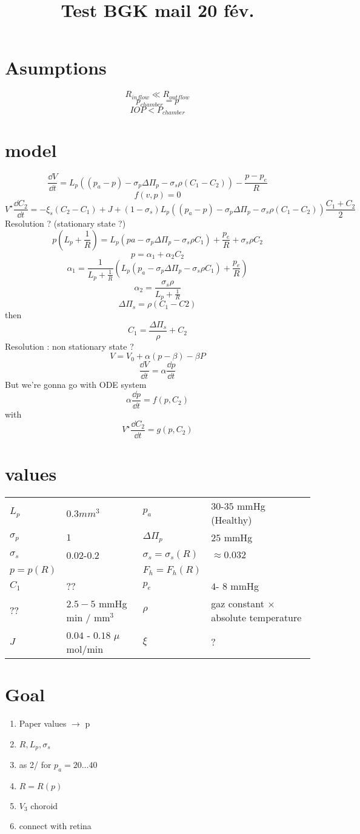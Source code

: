 \documentclass[11pt]{article}
\author{}
\title{Test BGK mail 20 fév.}
\date{}
\begin{document}
\section{Asumptions}
\[
R_{inflow} \ll R_{outflow}
\]
\[
p_{chamber} = p
\]
\[
IOP < P_{chamber}
\]

\section{model}
\[
\frac{\dd V}{\dd t} = L_{p} \left( (p_{a} -p) - \sigma_{p} \Delta \Pi_{p} - \sigma_{s} \rho (C_{1}- C_{2}) \right) - \frac{p - p_{e} }{R}
\]
\[
f(v,p) = 0
\]
\[
V^\star \frac{\dd C_2}{\dd t} = - \xi_s (C_2-C_1) + J + \left(1- \sigma_s\right)L_p\left((p_a-p) - \sigma_p \Delta \Pi_p - \sigma_s \rho (C_1-C_2) \right) \frac{C_1 + C_2}{2}
\]
Resolution ? (stationary state ?)
\[
p\left( L_p + \frac{1}{R} \right) = L_p \left(pa - \sigma_p \Delta \Pi_p - \sigma_s \rho C_1\right) + \frac{p_e}{R} + \sigma_s \rho C_2
\]
\[
p = \alpha_1 + \alpha_2 C_2
\]
\[
\alpha_1 = \frac{1}{L_p + \frac{1}{R}} \left( L_p \left( p_a - \sigma_p \Delta \Pi_p - \sigma_s \rho C_1 \right) + \frac{p_e}{R}\right)
\]
\[
\alpha_2 = \frac{\sigma_s \rho}{L_p + \frac{1}{R}}
\]
\[
\Delta \Pi_s = \rho (C_1 - C2)
\]
then 
\[
C_1 = \frac{\Delta \Pi_s}{\rho} + C_2
\]
Resolution : non stationary state ? 
\[
V = V_0 + \alpha (p - \beta ) - \beta P
\]
\[
\frac{\dd V}{\dd t}= \alpha \frac{\dd p}{\dd t}
\]
But we're gonna go with ODE system
\[
\alpha \frac{\dd p}{\dd t} = f(p, C_2)
\]
with
\[
V^\star \frac{\dd C_2}{\dd t} = g(p, C_2)
\]
\section{values}
\begin{tabular}{|l|l||l|l|}
 \hline
$ L_p $ &$0.3 mm^ 3$&$p_a$&  $30$-$35$ mmHg (Healthy)\\

$\sigma_p$& $ 1$& $\Delta \Pi_p$&$25$ mmHg\\

$\sigma_s$& $0.02$-$0.2$& $\sigma_s =  \sigma_s (R)$& $\approx 0.032$\\

$p = p(R)$&& $F_h = F_h(R)$&\\

$C_1 $& ??& $p_e$& $ 4 $- $8$ mmHg\\

?? & $2.5 - 5$ mmHg min / mm$^3$
& $\rho$& gaz constant $ \times$ absolute temperature \\

$J$ & $0.04$ - $0.18$  $\mu$ mol/min

&$\xi$&?\\
\hline
\end{tabular}
\section{Goal}
\begin{enumerate}
\item Paper values $\rightarrow$ p
\item $R,L_p,\sigma_s$
\item as 2/ for $p_a = 20 \ldots 40$ 
\item $R = R(p)$
\item $V_3$ choroid
\item connect with retina
\end{enumerate}
\end{document}
